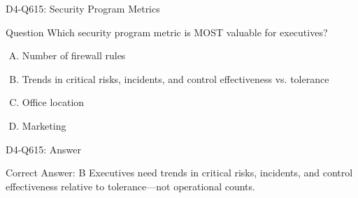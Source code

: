 \documentclass{beamer}
\begin{document}
	\begin{frame}{D4-Q615: Security Program Metrics}
		\begin{block}{Question}
			Which security program metric is MOST valuable for executives?
		\end{block}
		\begin{enumerate}[(A)]
			\item Number of firewall rules
			\item Trends in critical risks, incidents, and control effectiveness vs. tolerance
			\item Office location
			\item Marketing
		\end{enumerate}
	\end{frame}
	\begin{frame}{D4-Q615: Answer}
		\begin{block}{Correct Answer: B}
			Executives need trends in critical risks, incidents, and control effectiveness relative to tolerance—not operational counts.
		\end{block}
	\end{frame}
\end{document}
